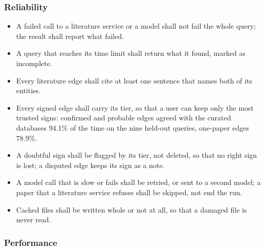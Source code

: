 \documentclass[11pt,a4paper]{article}
\begin{document}
\subsubsection{Reliability}
\begin{itemize}
  \item A failed call to a literature service or a model shall not fail the whole query; the
    result shall report what failed.
  \item A query that reaches its time limit shall return what it found, marked as incomplete.
  \item Every literature edge shall cite at least one sentence that names both of its entities.
  \item Every signed edge shall carry its tier, so that a user can keep only the most trusted
    signs: confirmed and probable edges agreed with the curated databases 94.1\% of the time on the nine
    held-out queries, one-paper edges 78.9\%.
  \item A doubtful sign shall be flagged by its tier, not deleted, so that no right sign is lost;
    a disputed edge keeps its sign as a note.
  \item A model call that is slow or fails shall be retried, or sent to a second model; a paper
    that a literature service refuses shall be skipped, not end the run.
  \item Cached files shall be written whole or not at all, so that a damaged file is never read.
\end{itemize}

\subsubsection{Performance}
\end{document}
